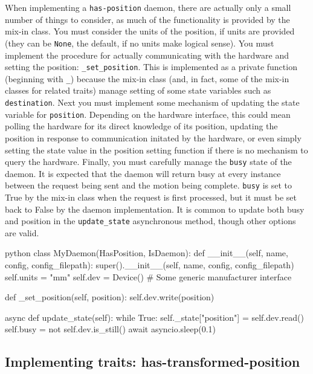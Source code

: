 When implementing a \texttt{has-position} daemon, there are actually only a small number of things to consider, as much of the functionality is provided by the mix-in class.
You must consider the units of the position, if units are provided (they can be \texttt{None}, the default, if no units make logical sense).
You must implement the procedure for actually communicating with the hardware and setting the position: \texttt{\_set\_position}.
This is implemented as a private function (beginning with \texttt{\_}) because the mix-in class (and, in fact, some of the mix-in classes for related traits) manage setting of some state variables such as \texttt{destination}.
Next you must implement some mechanism of updating the state variable for \texttt{position}.
Depending on the hardware interface, this could mean polling the hardware for its direct knowledge of its position, updating the position in response to communication initated by the hardware, or even simply setting the state value in the position setting function if there is no mechanism to query the hardware.
Finally, you must carefully manage the \texttt{busy} state of the daemon.
It is expected that the daemon will return busy at every instance between the request being sent and the motion being complete.
\texttt{busy} is set to True by the mix-in class when the request is first processed, but it must be set back to False by the daemon implementation.
It is common to update both busy and position in the \texttt{update\_state} asynchronous method, though other options are valid.

\begin{codefragment}{python}
class MyDaemon(HasPosition, IsDaemon):
    def __init__(self, name, config, config_filepath):
        super().__init__(self, name, config, config_filepath)
        self.units = "mm"
        self.dev = Device() # Some generic manufacturer interface
    
    def _set_position(self, position):
        self.dev.write(position)

    async def update_state(self):
        while True:
            self._state["position"] = self.dev.read()
            self.busy = not self.dev.is_still()
            await asyncio.sleep(0.1)
\end{codefragment}

\subsection{Implementing traits: has-transformed-position}

